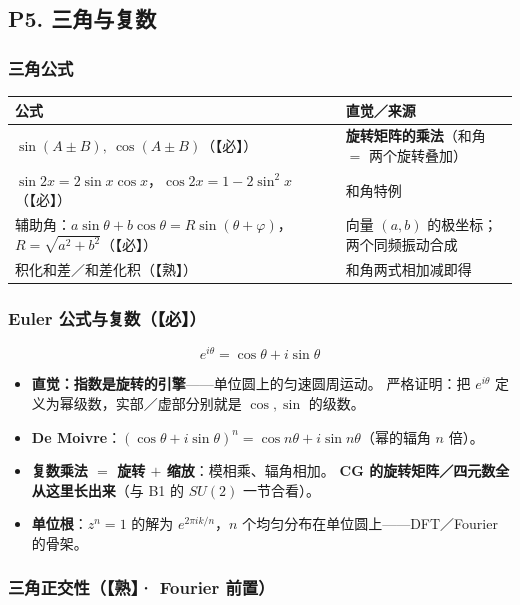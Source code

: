 \subsection{P5. 三角与复数}

\subsubsection{三角公式}

\begin{center}
\begin{tabular}{L{7.4cm}L{6.8cm}}
\toprule
\textbf{公式} & \textbf{直觉／来源} \\
\midrule
$\sin(A\pm B),\ \cos(A\pm B)$（【必】） & \textbf{旋转矩阵的乘法}（和角 $=$ 两个旋转叠加） \\
$\sin 2x=2\sin x\cos x$，$\cos2x=1-2\sin^2x$（【必】） & 和角特例 \\
辅助角：$a\sin\theta+b\cos\theta=R\sin(\theta+\varphi)$，$R=\sqrt{a^2+b^2}$（【必】） &
向量 $(a,b)$ 的极坐标；两个同频振动合成 \\
积化和差／和差化积（【熟】） & 和角两式相加减即得 \\
\bottomrule
\end{tabular}
\end{center}

\subsubsection{Euler 公式与复数（【必】）}

\[
e^{i\theta}=\cos\theta+i\sin\theta
\]

\begin{itemize}
  \item \textbf{直觉：指数是旋转的引擎}——单位圆上的匀速圆周运动。
        严格证明：把 $e^{i\theta}$ 定义为幂级数，实部／虚部分别就是 $\cos,\sin$ 的级数。
  \item \textbf{De Moivre}：$(\cos\theta+i\sin\theta)^n=\cos n\theta+i\sin n\theta$（幂的辐角 $n$ 倍）。
  \item \textbf{复数乘法 $=$ 旋转 $+$ 缩放}：模相乘、辐角相加。
        \textbf{CG 的旋转矩阵／四元数全从这里长出来}（与 B1 的 $SU(2)$ 一节合看）。
  \item \textbf{单位根}：$z^n=1$ 的解为 $e^{2\pi ik/n}$，$n$ 个均匀分布在单位圆上——DFT／Fourier 的骨架。
\end{itemize}

\subsubsection{三角正交性（【熟】· Fourier 前置）}

